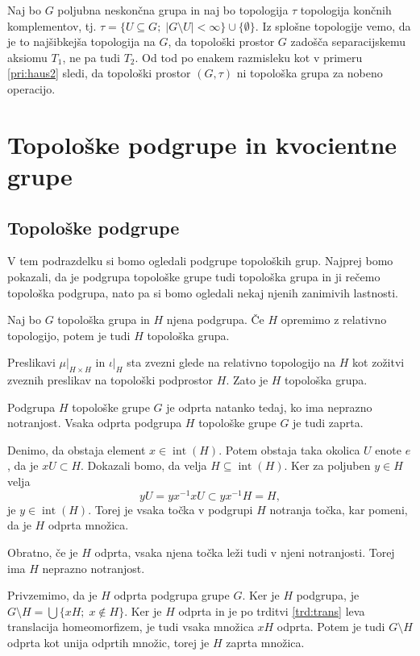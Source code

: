 \documentclass[mat1]{fmfdelo}
\DeclareMathOperator{\interior}{int}
\begin{document}
\begin{primer}
Naj bo $G$ poljubna neskončna grupa in naj bo topologija $\tau$ topologija končnih komplementov, tj. $\tau = \lbrace U \subseteq G ;\; |G\setminus U| < \infty \rbrace \cup \lbrace \emptyset \rbrace$.
Iz splošne topologije vemo, da je to najšibkejša topologija na $G$, da topološki prostor $G$ zadošča separacijskemu aksiomu $T_1$, ne pa tudi $T_2$. Od tod po enakem razmisleku kot v primeru \ref{pri:haus2} sledi, da topološki prostor $(G, \tau)$ ni topološka grupa za nobeno operacijo.
\end{primer}

\section{Topološke podgrupe in kvocientne grupe}
\subsection{Topološke podgrupe}
V tem podrazdelku si bomo ogledali podgrupe topoloških grup. Najprej bomo pokazali, da je podgrupa topološke grupe tudi topološka grupa in ji rečemo topološka podgrupa, nato pa si bomo ogledali nekaj njenih zanimivih lastnosti.
\begin{trditev}\label{trd:toppodgrupa}
Naj bo $G$ topološka grupa in $H$ njena podgrupa. Če $H$ opremimo z relativno topologijo, potem je tudi $H$ topološka grupa.
\end{trditev}

\begin{dokaz}
Preslikavi $\mu|_{H \times H}$ in $\iota|_H$ sta zvezni glede na relativno topologijo na $H$ kot zožitvi zveznih preslikav na topološki podprostor $H$. Zato je $H$ topološka grupa.
\end{dokaz}

\begin{trditev}\label{trd:odpzap}
Podgrupa $H$ topološke grupe $G$ je odprta natanko tedaj, ko ima ne\-praz\-no not\-ran\-jost. Vsaka odprta podgrupa $H$ topološke grupe $G$ je tudi zaprta.
\end{trditev}

\begin{dokaz}
Denimo, da obstaja element $x \in \interior(H)$. Potem obstaja taka okolica $U$ enote $e$, da je $xU \subset H$. Dokazali bomo, da velja $H \subseteq \interior(H)$. Ker za poljuben $y \in H$ velja \[yU = yx^{-1}xU \subset yx^{-1}H = H,\] je $y \in \interior(H)$. Torej je vsaka točka v podgrupi $H$ notranja točka, kar pomeni, da je $H$ odprta množica.

Obratno, če je $H$ odprta, vsaka njena točka leži tudi v njeni notranjosti. Torej ima $H$ neprazno notranjost.

Privzemimo, da je $H$ odprta podgrupa grupe $G$. Ker je $H$ podgrupa, je $G\setminus H = \bigcup \lbrace xH ;\; x \notin H \rbrace$. Ker je $H$ odprta in je po trditvi \ref{trd:trans} leva translacija homeomorfizem, je tudi vsaka množica $xH$ odprta. Potem je tudi $G \setminus H$ odprta kot unija odprtih množic, torej je $H$ zaprta množica.
\end{dokaz}
\end{document}
